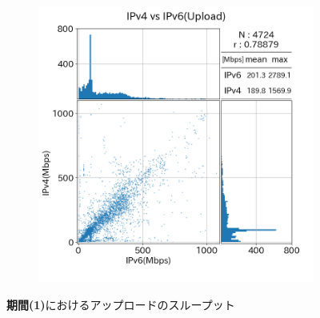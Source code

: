 \begin{figure}[htbp]
\begin{center}
\begin{subfigure}[b]{0.49\textwidth}
            \includegraphics[width=1.0\textwidth]{fig/old_diffISP_ul.png}
            \label{old_diffISP_ul}
        \end{subfigure}
        \caption{{\bf 期間(1)}におけるアップロードのスループット}
        \label{fig:old_isp_ul}


\end{center}
\end{figure}
